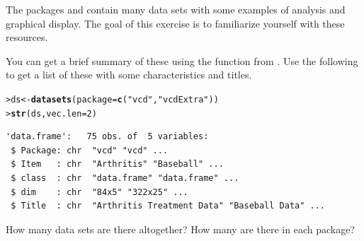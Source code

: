 \documentclass[10pt]{report}\usepackage[]{graphicx}\usepackage[]{color}
\makeatletter
\newcommand{\hlnum}[1]{\textcolor[rgb]{0.686,0.059,0.569}{#1}}%
\newcommand{\hlstr}[1]{\textcolor[rgb]{0.192,0.494,0.8}{#1}}%
\newcommand{\hlopt}[1]{\textcolor[rgb]{0,0,0}{#1}}%
\newcommand{\hlstd}[1]{\textcolor[rgb]{0.345,0.345,0.345}{#1}}%
\newcommand{\hlkwb}[1]{\textcolor[rgb]{0.69,0.353,0.396}{#1}}%
\newcommand{\hlkwc}[1]{\textcolor[rgb]{0.333,0.667,0.333}{#1}}%
\newcommand{\hlkwd}[1]{\textcolor[rgb]{0.737,0.353,0.396}{\textbf{#1}}}%
\newenvironment{kframe}{%
 \def\at@end@of@kframe{}%
 \ifinner\ifhmode%
  \def\at@end@of@kframe{\end{minipage}}%
  \begin{minipage}{\columnwidth}%
 \fi\fi%
 \def\FrameCommand##1{\hskip\@totalleftmargin \hskip-\fboxsep
 \colorbox{shadecolor}{##1}\hskip-\fboxsep
     \hskip-\linewidth \hskip-\@totalleftmargin \hskip\columnwidth}%
 \MakeFramed {\advance\hsize-\width
   \@totalleftmargin\z@ \linewidth\hsize
   \@setminipage}}%
 {\par\unskip\endMakeFramed%
 \at@end@of@kframe}
\newenvironment{knitrout}{}{} %
\renewenvironment{knitrout}{\small\renewcommand{\baselinestretch}{.85}}{} %
\makeatother
\begin{document}
\begin{Exercises}

\exercise The packages  and  contain many data sets with some
examples of analysis and graphical display.  The goal of this exercise is to
familiarize yourself with these resources.

You can get a brief summary of
these using the function  from .  Use the following to get a list of
these with some characteristics and titles.
\begin{knitrout}\footnotesize
{}\color{fgcolor}\begin{kframe}
\begin{alltt}
\hlstd{> }\hlstd{ds} \hlkwb{<-} \hlkwd{datasets}\hlstd{(}\hlkwc{package} \hlstd{=} \hlkwd{c}\hlstd{(}\hlstr{"vcd"}\hlstd{,} \hlstr{"vcdExtra"}\hlstd{))}
\hlstd{> }\hlkwd{str}\hlstd{(ds,} \hlkwc{vec.len} \hlstd{=} \hlnum{2}\hlstd{)}
\end{alltt}
\begin{verbatim}
'data.frame':	75 obs. of  5 variables:
 $ Package: chr  "vcd" "vcd" ...
 $ Item   : chr  "Arthritis" "Baseball" ...
 $ class  : chr  "data.frame" "data.frame" ...
 $ dim    : chr  "84x5" "322x25" ...
 $ Title  : chr  "Arthritis Treatment Data" "Baseball Data" ...
\end{verbatim}
\end{kframe}
\end{knitrout}
  \begin{enumerate*}
    \item How many data sets are there altogether?  How many are there in each package?
\end{enumerate*}
\end{Exercises}
\end{document}
